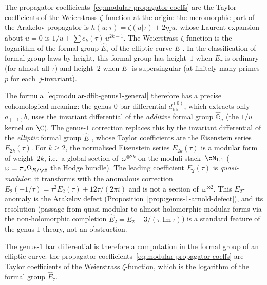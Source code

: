 \begin{remark}%
\label{rem:elliptic-propagator-formal-group}%
%
%
The propagator coefficients~\eqref{eq:modular-propagator-coeffs}
are the Taylor coefficients of the Weierstrass
$\zeta$-function at the origin: the meromorphic part of the
Arakelov propagator is
$h(u;\tau) = \zeta(u|\tau) + 2\eta_\tau u$, whose Laurent
expansion about $u=0$ is $1/u + \sum c_k(\tau)\, u^{2k-1}$.
The Weierstrass $\zeta$-function is the logarithm of the
formal group $\hat{E}_\tau$ of the elliptic curve $E_\tau$.
In the classification of formal group laws by height, this
formal group has height~$1$ when $E_\tau$ is ordinary
(for almost all $\tau$) and height~$2$ when $E_\tau$ is
supersingular (at finitely many primes $p$ for each~$j$-invariant).

The formula~\eqref{eq:modular-dfib-genus1-general} therefore
has a precise cohomological meaning: the genus-$0$ bar
differential $d_{\mathrm{fib}}^{(0)}$, which extracts only
$a_{(-1)}b$, uses the invariant differential of the
\emph{additive} formal group $\hat{\mathbb{G}}_a$
(the $1/u$ kernel on $\C$). The genus-$1$ correction
replaces this by the invariant differential of the
\emph{elliptic} formal group $\hat{E}_\tau$,
whose Taylor coefficients are the Eisenstein series
$E_{2k}(\tau)$. For $k \ge 2$, the normalised Eisenstein
series $E_{2k}(\tau)$ is a modular form of weight~$2k$,
i.e.\ a global section of~$\omega^{\otimes 2k}$ on
the moduli stack~$\cM_{1,1}$
($\omega = \pi_\ast \Omega_{E/\cM}$ the Hodge
bundle). The leading coefficient
$E_2(\tau)$ is \emph{quasi-modular}: it transforms
with the anomalous correction
$E_2(-1/\tau) = \tau^2 E_2(\tau) + 12\tau/(2\pi i)$
and is not a section of~$\omega^{\otimes 2}$. This
$E_2$-anomaly is the Arakelov defect
(Proposition~\ref{prop:genus-1-arnold-defect}), and its
resolution (passage from quasi-modular to almost-holomorphic
modular forms via the non-holomorphic completion
$\widehat{E}_2 = E_2 - 3/(\pi\,\mathrm{Im}\,\tau)$)
is a standard feature of the genus-$1$ theory, not an
obstruction.

The genus-$1$ bar differential is therefore a computation
in the formal group of an elliptic curve: the propagator
coefficients~\eqref{eq:modular-propagator-coeffs} are
Taylor coefficients of the Weierstrass $\zeta$-function,
which is the logarithm of the formal group
$\hat{E}_\tau$.
\end{remark}

